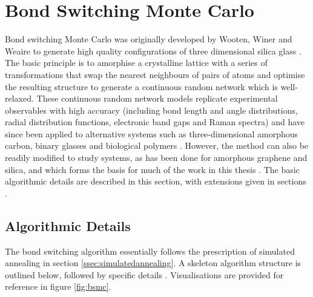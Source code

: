 \section{Bond Switching Monte Carlo}
\label{s:bondswitch}

Bond switching Monte Carlo was originally developed by Wooten, Winer and Weaire to generate high quality configurations of three dimensional silica glass \cite{Wooten1985}.
The basic principle is to amorphise a crystalline lattice with a series of transformations that swap the nearest neighbours of pairs of atoms and optimise the resulting structure to generate a continuous random network which is well\--relaxed.
These continuous random network models replicate experimental observables with high accuracy (including bond length and angle distributions, radial distribution functions, electronic band gaps and Raman spectra) and have since been applied to alternative systems such as three\--dimensional amorphous carbon, binary glasses and biological polymers \cite{Treacy2012,Tu1998,Djordjevic1995,Mousseau2004,Huisman2008,Broedersz2014}.
However, the method can also be readily modified to study \td{} systems, as has been done for amorphous graphene and silica, and which forms the basis for much of the work in this thesis  \cite{Kumar2014,Jain2018}.
The basic algorithmic details are described in this section, with extensions given in sections .

\subsection{Algorithmic Details} 

The \td{} bond switching algorithm essentially follows the prescription of simulated annealing in section \ref{ssec:simulatedannealing}.
A skeleton algorithm structure is outlined below, followed by specific details \cite{Kumar2012}.
Visualisations are provided for reference in figure \ref{fig:bsmc}.

